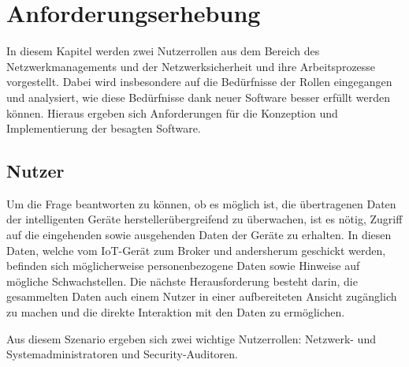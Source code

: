 \chapter{Anforderungserhebung}
In diesem Kapitel werden zwei Nutzerrollen aus dem Bereich des Netzwerkmanagements und der Netzwerksicherheit und ihre Arbeitsprozesse vorgestellt. Dabei wird insbesondere auf die Bedürfnisse der Rollen eingegangen und analysiert, wie diese Bedürfnisse dank neuer Software besser erfüllt werden können. Hieraus ergeben sich Anforderungen für die Konzeption und Implementierung der besagten Software.

\section{Nutzer}
    Um die Frage beantworten zu können, ob es möglich ist, die übertragenen Daten der intelligenten Geräte herstellerübergreifend zu überwachen, ist es nötig, Zugriff auf die eingehenden sowie ausgehenden Daten der Geräte zu erhalten. In diesen Daten, welche vom \ac{IoT}-Gerät zum Broker und andersherum geschickt werden, befinden sich möglicherweise personenbezogene Daten sowie Hinweise auf mögliche Schwachstellen.
    Die nächste Herausforderung besteht darin, die gesammelten Daten auch einem Nutzer in einer aufbereiteten Ansicht zugänglich zu machen und die direkte Interaktion mit den Daten zu ermöglichen.

    Aus diesem Szenario ergeben sich zwei wichtige Nutzerrollen: Netzwerk- und Systemadministratoren und Security-Auditoren.
    
